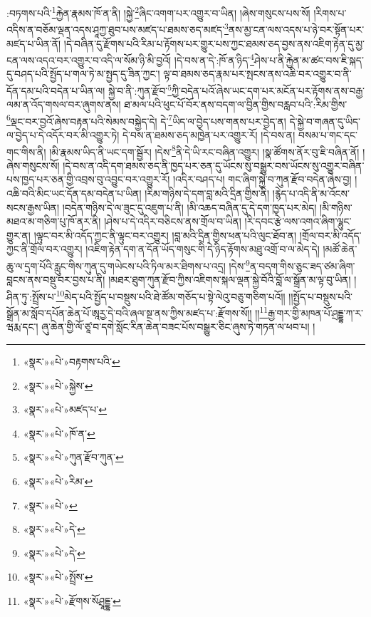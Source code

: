 :བཏགས་པའི་\footnote{«སྣར་»«པེ་»བརྟགས་པའི་}རྐྱེན་རྣམས་ཁོ་ན་ནི། །སྐྱེ་\footnote{«སྣར་»«པེ་»སྐྱེས་}ཞིང་འགག་པར་འགྱུར་བ་ཡིན། །ཞེས་གསུངས་པས་སོ། །རིགས་པ་འདིས་ན་བཅོམ་ལྡན་འདས་ཤཱཀྱ་ཐུབ་པས་མཛད་པ་ཐམས་ཅད་མཛད་\footnote{«སྣར་»«པེ་»མཛད་པ་}ནས་མྱ་ངན་ལས་འདས་པ་ཉེ་བར་སྟོན་པར་མཛད་པ་ཡིན་ནོ། །དེ་བཞིན་དུ་རྫོགས་པའི་རིམ་པ་རྟོགས་པར་གྱུར་པས་ཀྱང་ཐམས་ཅད་བྱས་ནས་འཇིག་རྟེན་དུ་མྱ་ངན་ལས་འདའ་བར་འགྱུར་བ་འདི་ལ་སོམ་ཉི་མི་བྱའོ། །དེ་བས་ན་དེ་:ཁོ་ན་ཉིད་\footnote{«སྣར་»«པེ་»ཁོ་ན་}ཤེས་པ་ནི་རྐྱེན་མ་ཚང་བས་ཇི་སྐད་དུ་བཤད་པའི་སྤྱོད་པ་གལ་ཏེ་མ་སྤྱད་དུ་ཟིན་ཀྱང་། ལྟ་བ་ཐམས་ཅད་རྣམ་པར་སྤངས་ནས་འཆི་བར་འགྱུར་བ་ནི་དོན་དམ་པའི་བདེན་པ་ཡིན་ལ། སྐྱེ་བ་ནི་:ཀུན་རྫོབ་\footnote{«སྣར་»«པེ་»ཀུན་རྫོབ་ཀུན་}ཀྱི་བདེན་པའོ་ཞེས་ཡང་དག་པར་མངོན་པར་རྟོགས་ནས་བརྒྱ་ལམ་ན་འོད་གསལ་བར་ཞུགས་ནས། ཐ་མལ་པའི་ཕུང་པོ་བོར་ནས་བདག་ལ་བྱིན་གྱིས་བརླབ་པའི་:རིམ་གྱིས་\footnote{«སྣར་»«པེ་»རིམ་}ལྡང་བར་བྱའོ་ཞེས་བརྟན་པའི་སེམས་བསྐྱེད་དེ། དེ་\footnote{«སྣར་»«པེ་»}ཡིད་ལ་བྱེད་པས་གནས་པར་བྱེད་ན། དེ་སྐྱེ་བ་གཞན་དུ་ཡིད་ལ་བྱེད་པ་དེ་འདོར་བར་མི་འགྱུར་ཏེ། དེ་བས་ན་ཐམས་ཅད་མཁྱེན་པར་འགྱུར་རོ། །དེ་བས་ན། བསམ་པ་གང་དང་གང་གིས་ནི། །མི་རྣམས་ཡིད་ནི་ཡང་དག་སྦྱོར། །དེས་\footnote{«སྣར་»«པེ་»དེ་}ནི་དེ་ཡི་རང་བཞིན་འགྱུར། །སྣ་ཚོགས་ནོར་བུ་ཇི་བཞིན་ནོ། །ཞེས་གསུངས་སོ། །དེ་བས་ན་འདི་དག་ཐམས་ཅད་ནི་ཁྱད་པར་ཅན་དུ་ཡོངས་སུ་བསྒྱུར་བས་ཡོངས་སུ་འགྱུར་བཞིན་པས་ཁྱད་པར་ཅན་གྱི་འབྲས་བུ་འབྱུང་བར་འགྱུར་རོ། །འདིར་བཤད་པ། གང་ཞིག་སྐྱེ་བ་ཀུན་རྫོབ་བདེན་ཞེས་བྱ། །འཆི་བའི་མིང་ཡང་དོན་དམ་བདེན་པ་ཡིན། །རིམ་གཉིས་དེ་དག་བླ་མའི་དྲིན་གྱིས་ནི། །རྙེད་པ་འདི་ནི་མ་འོངས་སངས་རྒྱས་ཡིན། །བདེན་གཉིས་དེ་ལ་ཟུང་དུ་འཇུག་པ་ནི། །མི་འཆད་བཞིན་དུ་དེ་དག་ཁྱད་པར་མེད། །མི་གཉིས་མཐའ་མ་གཅིག་པུ་ཁོ་ནར་ནི། །ཤེས་པ་དེ་འདིར་བཅིངས་ནས་གྲོལ་བ་ཡིན། །རི་དབང་རྩེ་ལས་འགའ་ཞིག་ལྷུང་གྱུར་ན། །ལྟུང་བར་མི་འདོད་ཀྱང་ནི་ལྟུང་བར་འགྱུར། །བླ་མའི་དྲིན་གྱིས་ཕན་པའི་ལུང་ཐོབ་ན། །གྲོལ་བར་མི་འདོད་ཀྱང་ནི་གྲོལ་བར་འགྱུར། །འཇིག་རྟེན་དག་ན་དོན་ཡོད་གསུང་གི་དེ་ཉིད་རྟོགས་མཐུ་འགྲོ་བ་ལ་མེད་དེ། །མཚོ་ཆེན་ཆུ་ལ་དྲག་པོའི་རླུང་གིས་ཀུན་དུ་གཡེངས་པའི་ཏིལ་མར་ཐིགས་པ་འདྲ། །དེས་\footnote{«སྣར་»«པེ་»དེ་}ན་བདག་གིས་ཅུང་ཟད་ཙམ་ཞིག་བླངས་ནས་བསྡུ་བར་བྱས་པ་ནི། །མཐར་ཐུག་ཀུན་རྫོབ་ཀྱིས་འཇིགས་སྐལ་ལྡན་སྐྱེ་བོའི་བློ་ལ་སྒྲོན་མ་ལྟ་བུ་ཡིན། །ཤིན་ཏུ་:སྤྲོས་པ་\footnote{«སྣར་»«པེ་»སྤྲོས་}མེད་པའི་སྤྱོད་པ་བསྡུས་པའི་ཐེ་ཚོམ་གཅོད་པ་སྟེ་ལེའུ་བཅུ་གཅིག་པའོ།། །།སྤྱོད་པ་བསྡུས་པའི་སྒྲོན་མ་སློབ་དཔོན་ཆེན་པོ་ཨཱརྱ་དེ་བའི་ཞལ་སྔ་ནས་ཀྱིས་མཛད་པ་:རྫོགས་སོ།། །།\footnote{«སྣར་»«པེ་»རྫོགས་སོཤྲཱདྡྷ་}རྒྱ་གར་གྱི་མཁན་པོ་ཤྲདྡྷ་ཀ་ར་ཝརྨ་དང་། ཞུ་ཆེན་གྱི་ལོ་ཙཱ་བ་དགེ་སློང་རིན་ཆེན་བཟང་པོས་བསྒྱུར་ཅིང་ཞུས་ཏེ་གཏན་ལ་ཕབ་པ། ། 